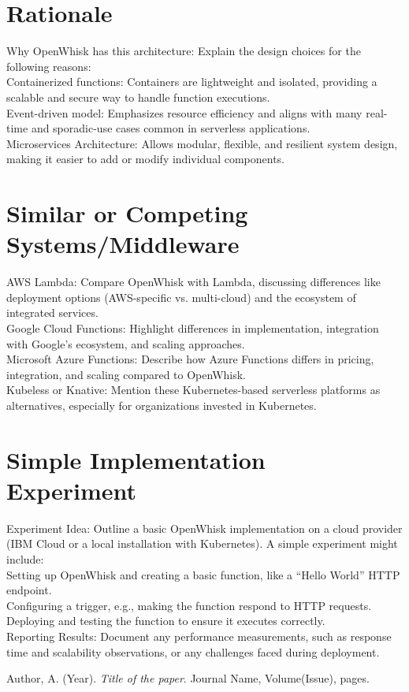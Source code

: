 \documentclass[12pt]{article}
\begin{document}
\section{Rationale}
Why OpenWhisk has this architecture: Explain the design choices for the following reasons:\\
Containerized functions: Containers are lightweight and isolated, providing a scalable and secure way to handle function executions.\\
Event-driven model: Emphasizes resource efficiency and aligns with many real-time and sporadic-use cases common in serverless applications.\\
Microservices Architecture: Allows modular, flexible, and resilient system design, making it easier to add or modify individual components.

\section{Similar or Competing Systems/Middleware}
AWS Lambda: Compare OpenWhisk with Lambda, discussing differences like deployment options (AWS-specific vs. multi-cloud) and the ecosystem of integrated services.\\
Google Cloud Functions: Highlight differences in implementation, integration with Google’s ecosystem, and scaling approaches.\\
Microsoft Azure Functions: Describe how Azure Functions differs in pricing, integration, and scaling compared to OpenWhisk.\\
Kubeless or Knative: Mention these Kubernetes-based serverless platforms as alternatives, especially for organizations invested in Kubernetes.

\section{Simple Implementation Experiment}
Experiment Idea: Outline a basic OpenWhisk implementation on a cloud provider (IBM Cloud or a local installation with Kubernetes). A simple experiment might include:\\
Setting up OpenWhisk and creating a basic function, like a “Hello World” HTTP endpoint.\\
Configuring a trigger, e.g., making the function respond to HTTP requests.\\
Deploying and testing the function to ensure it executes correctly.\\
Reporting Results: Document any performance measurements, such as response time and scalability observations, or any challenges faced during deployment.

\begin{thebibliography}{9}
    Author, A. (Year). \textit{Title of the paper}. Journal Name, Volume(Issue), pages.
\end{thebibliography}
\end{document}
